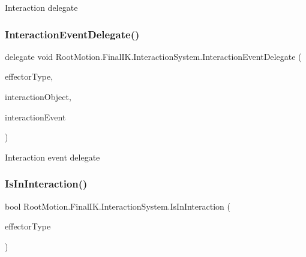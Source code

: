 Interaction delegate 

\mbox{\label{class_root_motion_1_1_final_i_k_1_1_interaction_system_ae04cc230b351d4b73458372899d3f6d8}} 
\subsubsection{\texorpdfstring{Interaction\+Event\+Delegate()}{InteractionEventDelegate()}}
{\footnotesize\ttfamily delegate void Root\+Motion.\+Final\+I\+K.\+Interaction\+System.\+Interaction\+Event\+Delegate (\begin{DoxyParamCaption}\item[{\mbox{\hyperlink{namespace_root_motion_1_1_final_i_k_ae0dd2058c7667b6f132c11a6b860c14a}{Full\+Body\+Biped\+Effector}}}]{effector\+Type,  }\item[{\mbox{\hyperlink{class_root_motion_1_1_final_i_k_1_1_interaction_object}{Interaction\+Object}}}]{interaction\+Object,  }\item[{\mbox{\hyperlink{class_root_motion_1_1_final_i_k_1_1_interaction_object_1_1_interaction_event}{Interaction\+Object.\+Interaction\+Event}}}]{interaction\+Event }\end{DoxyParamCaption})}



Interaction event delegate 

\mbox{\label{class_root_motion_1_1_final_i_k_1_1_interaction_system_a27dd4f8a87aa6532d1c26eb562e4b149}} 
\subsubsection{\texorpdfstring{Is\+In\+Interaction()}{IsInInteraction()}}
{\footnotesize\ttfamily bool Root\+Motion.\+Final\+I\+K.\+Interaction\+System.\+Is\+In\+Interaction (\begin{DoxyParamCaption}\item[{\mbox{\hyperlink{namespace_root_motion_1_1_final_i_k_ae0dd2058c7667b6f132c11a6b860c14a}{Full\+Body\+Biped\+Effector}}}]{effector\+Type }\end{DoxyParamCaption})}



